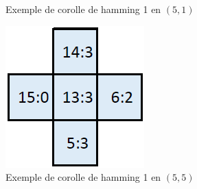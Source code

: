 \begin{exmp}
\begin{minipage}{0.24\textwidth}
\begin{figure}[H]
			\caption{Exemple de corolle de hamming 1 en $(5,1)$ }
			\label{fig:corolle_ex_orientee_1}
		\end{figure}
	\end{minipage}\hfill
	\begin{minipage}{0.24\textwidth}
		\begin{figure}[H]
			\centering
			\includegraphics[width=\linewidth]{images/corolle_ex_orientee_2}
			\caption{Exemple de corolle de hamming 1 en $(5,5)$}
			\label{fig:corolle_ex_orientee_2}
		\end{figure}
	\end{minipage}\hfill
	\begin{minipage}{0.24\textwidth}
		\begin{figure}[H]
			\centering

\end{figure}
\end{minipage}
\end{exmp}
